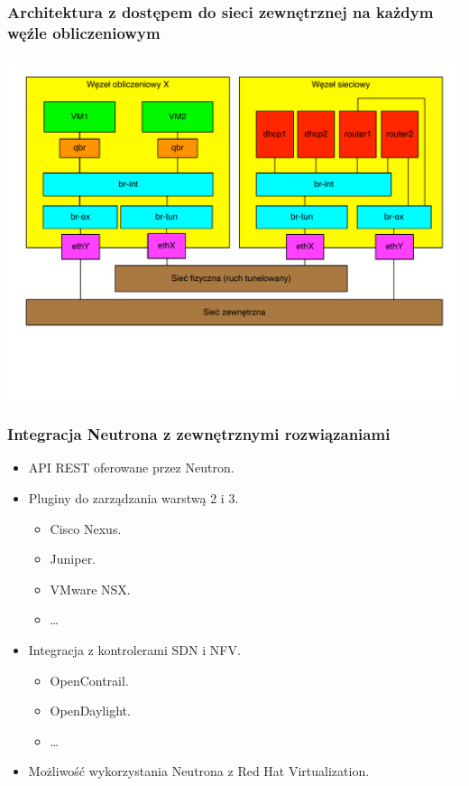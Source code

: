 \documentclass[dvipsnames,table]{beamer}
\begin{document}
\begin{frame}
	\frametitle{Architektura z dostępem do sieci zewnętrznej na każdym węźle obliczeniowym}
\includegraphics[width=1.00\textwidth]{img-neutron-provider.pdf}
\end{frame}

\begin{frame}
\frametitle{Integracja Neutrona z zewnętrznymi rozwiązaniami}
\begin{itemize}
	\item API REST oferowane przez Neutron.
	\item Pluginy do zarządzania warstwą 2 i 3.
	\begin{itemize}
		\item Cisco Nexus.
		\item Juniper.
		\item VMware NSX.
		\item \dots
	\end{itemize}
	\item Integracja z kontrolerami SDN i NFV.
	\begin{itemize}
		\item OpenContrail.
		\item OpenDaylight.
		\item \dots
	\end{itemize}
	\item Możliwość wykorzystania Neutrona z Red Hat Virtualization.
\end{itemize}
\end{frame}
\end{document}
